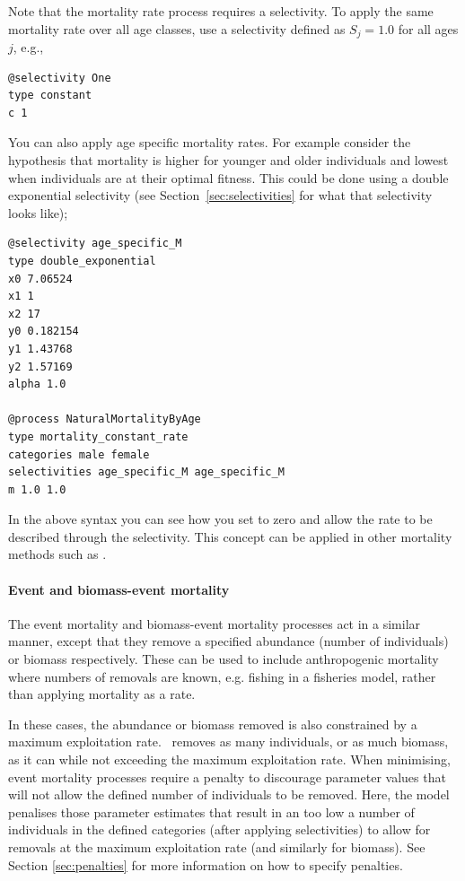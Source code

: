 Note that the mortality rate process requires a selectivity. To apply the same mortality rate over all age classes, use a selectivity defined as $S_j=1.0$ for all ages $j$, e.g.,

{\small{\begin{verbatim}
@selectivity One
type constant
c 1
\end{verbatim}}}

You can also apply age specific mortality rates. For example consider the hypothesis that mortality is higher for younger and older individuals and lowest when individuals are at their optimal fitness. This could be done using a double exponential selectivity (see Section~\ref{sec:selectivities} for what that selectivity looks like);

{\small{\begin{verbatim}
@selectivity age_specific_M
type double_exponential
x0 7.06524
x1 1
x2 17
y0 0.182154
y1 1.43768
y2 1.57169
alpha 1.0

@process NaturalMortalityByAge
type mortality_constant_rate
categories male female
selectivities age_specific_M age_specific_M
m 1.0 1.0
\end{verbatim}}}

In the above syntax you can see how you set  to zero and allow the rate to be described through the selectivity. This concept can be applied in other mortality methods such as .
\paragraph{Event and biomass-event mortality}

The event mortality and biomass-event mortality processes act in a similar manner, except that they remove a specified abundance (number of individuals) or biomass respectively. These can be used to include anthropogenic mortality where numbers of removals are known, e.g. fishing in a fisheries model, rather than applying mortality as a rate.

In these cases, the abundance or biomass removed is also constrained by a maximum exploitation rate. \CNAME\ removes as many individuals, or as much biomass, as it can while not exceeding the maximum exploitation rate. When minimising, event mortality processes require a penalty to discourage parameter values that will not allow the defined number of individuals to be removed. Here, the model penalises those parameter estimates that result in an too low a number of individuals in the defined categories (after applying selectivities) to allow for removals at the maximum exploitation rate (and similarly for biomass). See Section \ref{sec:penalties} for more information on how to specify penalties.

